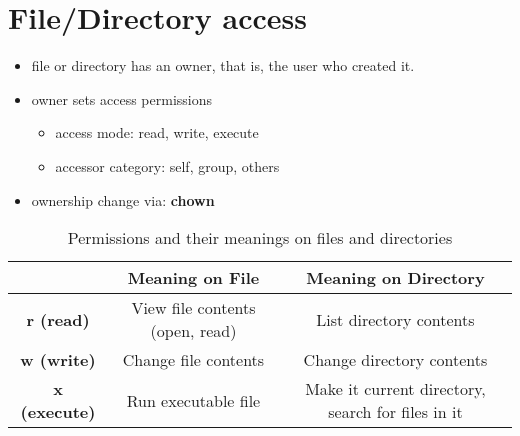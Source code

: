\documentclass{report}
\begin{document}
  \section{File/Directory access}
  \begin{itemize}
    \item file or directory has an owner, that is, the user who created it.
    \item owner sets access permissions
      \begin{itemize}
        \item access mode: read, write, execute 
        \item accessor category: self, group, others
      \end{itemize}
    \item ownership change via: \textbf{chown}
  \end{itemize}
\begin{table}[ht]
\centering
\begin{tabular}{|c|c|c|}
\hline
 & \textbf{Meaning on File} & \textbf{Meaning on Directory} \\ \hline
\textbf{r (read)} & View file contents (open, read) & List directory contents \\ \hline
\textbf{w (write)} & Change file contents & Change directory contents \\ \hline
\textbf{x (execute)} & Run executable file & Make it current directory, search for files in it \\ \hline
\end{tabular}
\caption{Permissions and their meanings on files and directories}
\end{table}
\end{document}

